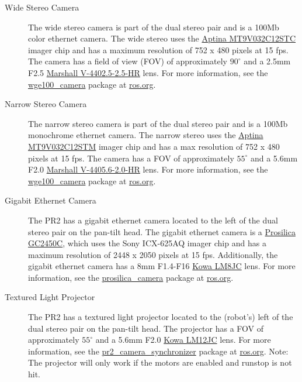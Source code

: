 \begin{description}
\label{stereo camera}
\item[Wide Stereo Camera] The wide stereo camera is part of the dual stereo pair
  and is a 100Mb color ethernet camera. The wide stereo uses the
  \href{http://www.aptina.com/products/image_sensors/mt9v032c12stc/#overview}{Aptina
    MT9V032C12STC} imager chip and has a maximum resolution of 752 x 480 pixels
  at 15 fps. The camera has a field of view (FOV) of approximately $90^\circ$
  and a 2.5mm F2.5
  \href{http://www.mars-cam.com/lenses/ccd_cmos/Technology%20Report(V-4402.5-2.5-HR).pdf}{Marshall
    V-4402.5-2.5-HR} lens. For more information, see the
  \href{http://www.ros.org/wiki/wge100_camera}{wge100\_camera} package at
  \href{http://www.ros.org}{ros.org}.

\item[Narrow Stereo Camera] The narrow stereo camera is part of the dual stereo
  pair and is a 100Mb monochrome ethernet camera.  The narrow stereo uses the
  \href{http://www.aptina.com/products/image_sensors/mt9v032c12stm/#overview}{Aptina
    MT9V032C12STM} imager chip and has a max resolution of 752 x 480 pixels at
  15 fps. The camera has a FOV of approximately $55^\circ$ and a 5.6mm F2.0
  \href{http://www.mars-cam.com/lenses/ccd_cmos/Technology%20Report(V-4405.6-2.0-HR).pdf}{Marshall
    V-4405.6-2.0-HR} lens. For more information, see the
  \href{http://www.ros.org/wiki/wge100_camera}{wge100\_camera} package at
  \href{http://www.ros.org}{ros.org}.

\item[Gigabit Ethernet Camera]
\label{ethernet camera}
The PR2 has a gigabit ethernet camera located to the left of the dual stereo
pair on the pan-tilt head.  The gigabit ethernet camera is a
\href{http://www.prosilica.com/products/gc2450.html}{Prosilica GC2450C}, which
uses the Sony ICX-625AQ imager chip and has a maximum resolution of 2448 x 2050
pixels at 15 fps.  Additionally, the gigabit ethernet camera has a 8mm F1.4-F16
\href{http://www.kowascope.com/frontend/proddetail.asp?pn=LM8JC&co=10000348}{Kowa
  LM8JC} lens. For more information, see the
\href{http://www.ros.org/wiki/prosilica_camera}{prosilica\_camera} package at
\href{http://www.ros.org}{ros.org}.

\item[Textured Light Projector]
\label{texture projector}
The PR2 has a textured light projector located to the (robot's) left of the dual
stereo pair on the pan-tilt head.  The projector has a FOV of approximately
$55^\circ$ and a 5.6mm F2.0
\href{http://www.kowascope.com/frontend/proddetail.asp?pn=LM12JC&co=10000348}{Kowa
  LM12JC} lens.  For more information, see the
\href{http://www.ros.org/wiki/pr2_camera_synchronizer}{pr2\_camera\_synchronizer} package at
\href{http://www.ros.org}{ros.org}.
Note: The projector will only work if the motors are enabled and runstop is not hit.

\end{description}

